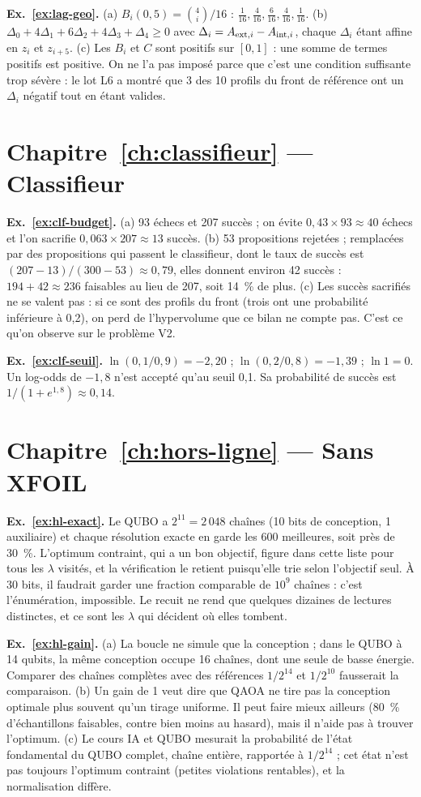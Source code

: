 \textbf{Ex.~\ref{ex:lag-geo}.} (a) $B_i(0{,}5)=\binom4i/16$ : $\tfrac1{16},\tfrac4{16},\tfrac6{16},\tfrac4{16},\tfrac1{16}$. (b) $\Delta_0+4\Delta_1+6\Delta_2+4\Delta_3+\Delta_4\ge0$ avec $\Delta_i=A_{{\rm ext},i}-A_{{\rm int},i}$, chaque $\Delta_i$ étant affine en $z_i$ et $z_{i+5}$. (c) Les $B_i$ et $C$ sont positifs sur $[0,1]$ : une somme de termes positifs est positive. On ne l'a pas imposé parce que c'est une condition suffisante trop sévère : le lot L6 a montré que 3 des 10 profils du front de référence ont un $\Delta_i$ négatif tout en étant valides.

\section*{Chapitre~\ref{ch:classifieur} — Classifieur}
\textbf{Ex.~\ref{ex:clf-budget}.} (a) 93 échecs et 207 succès ; on évite $0{,}43\times93\approx40$ échecs et l'on sacrifie $0{,}063\times207\approx13$ succès. (b) 53 propositions rejetées ; remplacées par des propositions qui passent le classifieur, dont le taux de succès est $(207-13)/(300-53)\approx0{,}79$, elles donnent environ 42 succès : $194+42\approx236$ faisables au lieu de 207, soit 14~\% de plus. (c) Les succès sacrifiés ne se valent pas : si ce sont des profils du front (trois ont une probabilité inférieure à 0,2), on perd de l'hypervolume que ce bilan ne compte pas. C'est ce qu'on observe sur le problème V2.

\textbf{Ex.~\ref{ex:clf-seuil}.} $\ln(0{,}1/0{,}9)=-2{,}20$ ; $\ln(0{,}2/0{,}8)=-1{,}39$ ; $\ln1=0$. Un log-odds de $-1{,}8$ n'est accepté qu'au seuil 0,1. Sa probabilité de succès est $1/(1+e^{1{,}8})\approx0{,}14$.

\section*{Chapitre~\ref{ch:hors-ligne} — Sans XFOIL}
\textbf{Ex.~\ref{ex:hl-exact}.} Le QUBO a $2^{11}=2\,048$ chaînes (10 bits de conception, 1 auxiliaire) et chaque résolution exacte en garde les 600 meilleures, soit près de 30~\%. L'optimum contraint, qui a un bon objectif, figure dans cette liste pour tous les $\lambda$ visités, et la vérification le retient puisqu'elle trie selon l'objectif seul. À 30 bits, il faudrait garder une fraction comparable de $10^9$ chaînes : c'est l'énumération, impossible. Le recuit ne rend que quelques dizaines de lectures distinctes, et ce sont les $\lambda$ qui décident où elles tombent.

\textbf{Ex.~\ref{ex:hl-gain}.} (a) La boucle ne simule que la conception ; dans le QUBO à 14 qubits, la même conception occupe 16 chaînes, dont une seule de basse énergie. Comparer des chaînes complètes avec des références $1/2^{14}$ et $1/2^{10}$ fausserait la comparaison. (b) Un gain de 1 veut dire que QAOA ne tire pas la conception optimale plus souvent qu'un tirage uniforme. Il peut faire mieux ailleurs (80~\% d'échantillons faisables, contre bien moins au hasard), mais il n'aide pas à trouver l'optimum. (c) Le cours IA et QUBO mesurait la probabilité de l'état fondamental du QUBO complet, chaîne entière, rapportée à $1/2^{14}$ ; cet état n'est pas toujours l'optimum contraint (petites violations rentables), et la normalisation diffère.

